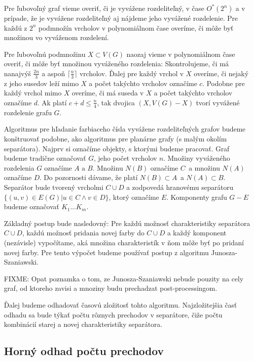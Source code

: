 Pre ľubovoľný graf vieme overiť, či je vyvážene rozdeliteľný, v čase $O^*(2^n)$ a v prípade, že je
vyvážene rozdeliteľný aj nájdeme jeho vyvážené rozdelenie. Pre každú z $2^n$ podmnožín vrcholov
v polynomiálnom čase overíme, či môže byť množinou vo vyváženom rozdelení.

Pre ľubovoľnú podmnožinu $X \subset V(G)$ naozaj vieme
v polynomiálnom čase overiť, či môže byť množinou vyváženého rozdelenia: Skontrolujeme, či má
nanajvýš $\frac{2n}{3}$ a aspoň $\lceil \frac{n}{3} \rceil$ vrcholov. Ďalej pre každý vrchol v $X$
overíme, či nejaký z jeho susedov leží mimo $X$ a počet takýchto vrcholov označíme $c$. Podobne
pre každý vrchol mimo $X$ overíme, či má suseda v $X$ a počet takýchto vrcholov označíme $d$. Ak
platí $c + d \leq \frac{n}{4}$, tak dvojica $(X, V(G) - X)$ tvorí vyvážené rozdelenie grafu $G$.

Algoritmus pre hľadanie farbiaceho čísla vyvážene rozdeliteľných grafov budeme konštruovať podobne, ako
algoritmus pre planárne grafy (s malým okolím separátora). Najprv si označíme objekty, s ktorými budeme
pracovať. Graf budeme tradične označovať $G$, jeho počet vrcholov $n$. Množiny vyváženého rozdelenia $G$
označíme $A$ a $B$. Množinu $N(B)$ označíme $C$ a množinu $N(A)$ označíme $D$. Do pozornosti dávame, že
platí $N(B) \subset A$ a $N(A) \subset B$. Separátor bude tvorený vrcholmi $C \cup D$ a zodpovedá hranovému
separátoru $\{(u,v) \in E(G) | u \in C \wedge v \in D\}$, ktorý označíme $E$. Komponenty grafu $G - E$ budeme
označovať $K_1 \ldots K_m$.

Základný postup bude nasledovný: Pre každú možnosť charakteristiky separátora $C \cup D$,
každú možnosť pridania novej farby do $C \cup D$ a každý komponent (nezávisle) vypočítame, aká
množina charakteristík v ňom môže byť po pridaní novej farby. Pre tento výpočet budeme používať
postup z algoritmu Junosza-Szaniawski.

FIXME: Opat poznamka o tom, ze Junosza-Szaniawski nebude pouzity na cely graf, od ktoreho zavisi
a mnoziny budu prechadzat post-processingom.

Ďalej budeme odhadovať časovú zložitosť tohto algoritmu. Najzložitejšia časť odhadu sa bude týkať
počtu rôznych prechodov v separátore, čiže počtu kombinácií starej a novej charakteristiky separátora.

\subsection{Horný odhad počtu prechodov}

